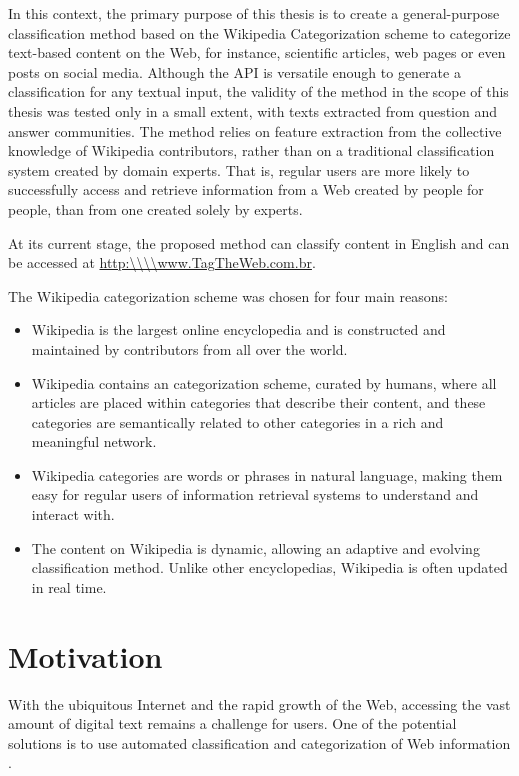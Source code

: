 In this context, the primary purpose of this thesis is to create a general-purpose classification method based on the Wikipedia Categorization scheme to categorize text-based content on the Web, for instance, scientific articles, web pages or even posts on social media. Although the API is versatile enough to generate a classification for any textual input, the validity of the method in the scope of this thesis was tested only in a small extent, with texts extracted from question and answer communities.
The method relies on feature extraction from the collective knowledge of Wikipedia contributors, rather than on a traditional classification system created by domain experts. That is, regular users are more likely to successfully access and retrieve information from a Web created by people for people, than from one created solely by experts.

At its current stage, the proposed method can classify content in English and can be accessed at \url{http:\\\\www.TagTheWeb.com.br}.

The Wikipedia categorization scheme was chosen for four main reasons: 

\begin{itemize}
\item  Wikipedia is the largest online encyclopedia and is constructed and maintained by contributors from all over the world.
\item Wikipedia contains an categorization scheme, curated by humans, where all articles are placed within categories that describe their content, and these categories are semantically related to other categories in a rich and meaningful network.
\item Wikipedia categories are words or phrases in natural language, making them easy for regular users of information retrieval systems to understand and interact with.
\item The content on Wikipedia is dynamic, allowing an adaptive and evolving classification method. Unlike other encyclopedias, Wikipedia is often updated in real time.
\end{itemize}


\section{\hspace*{3pt}Motivation}

With the ubiquitous Internet and the rapid growth of the Web, accessing the vast amount of digital text remains a challenge for users. One of the potential solutions is to use automated classification and categorization of Web information \cite{Gabrilovich:2005}.

